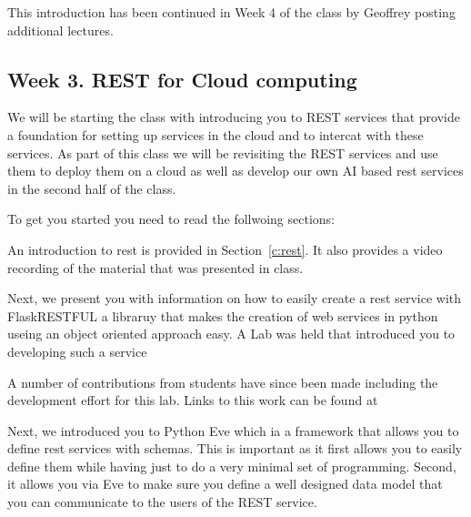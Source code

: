 This introduction has been continued in Week 4 of the class by
Geoffrey posting additional lectures.



\subsection{Week 3. REST for Cloud computing }

We will be starting the class with introducing you to REST services
that provide a foundation for setting up services in the cloud and to
intercat with these services. As part of this class we will be
revisiting the REST services and use them to deploy them on a cloud as
well as develop our own AI based rest services in the second half of
the class. 

To get you started you need to read the follwoing sections:

An introduction to rest is provided in Section~\ref{c:rest}. It also
provides a video recording of the material that was presented in
class.


Next, we present you with information on how to easily create a rest
service with FlaskRESTFUL a libraruy that makes the creation of web
services in python useing an object oriented approach easy. A Lab was
held that introduced you to developing such a service


A number of contributions from students have since been made including
the development effort for this lab. Links to this work can be found
at


Next, we introduced you to Python Eve which ia a framework that allows
you to define rest services with schemas. This is important as it
first allows you to easily define them while having just to do a very
minimal set of programming. Second, it allows you via Eve to make sure
you define a well designed data model that you can communicate to the
users of the REST service.


